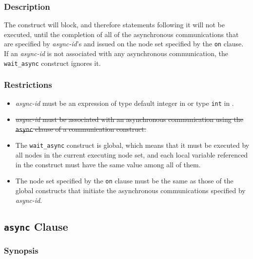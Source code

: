 \subsubsection*{Description}

The {\tt {}} construct will block, and therefore
statements following it will not be executed, until the completion of
all of 
the asynchronous communications that are specified by {\it async-id}'s
and issued on the node set specified by the {\tt on} clause.
If an {\it async-id} is not associated with any asynchronous
communication, the {\tt wait\_async} construct ignores it.

\subsubsection*{Restrictions}

\begin{itemize}
 \item {\it async-id} must be an expression of type default integer in
       {\XMPF} or type {\tt int} in {\XMPC}.
 \item \sout{{\it async-id} must be associated with an asynchronous
       communication using the {\tt async} clause of a communication
       construct.}
 \item The {\tt wait\_async} construct is global, which means that it must
       be executed by all nodes in the current executing node set, and
       each local variable referenced in the construct must have the
       same value among all of them.
 \item The node set specified by the {\tt on} clause must be the same as
       those of the global constructs that initiate the asynchronous
       communications specified by {\it async-id}.
\end{itemize}


\subsection{{\tt async} Clause}

\subsubsection*{Synopsis}

